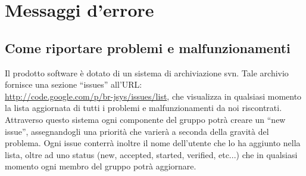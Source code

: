 \chapter{Messaggi d'errore}
\section{Come riportare problemi e malfunzionamenti}
Il prodotto software \`e dotato di un sistema di archiviazione svn. Tale archivio fornisce una sezione ``issues'' all'URL: \\ 
\href{http://code.google.com/p/br-jsys/issues/list}{http://code.google.com/p/br-jsys/issues/list}, che visualizza in qualsiasi momento la lista aggiornata di tutti i problemi e malfunzionamenti da noi riscontrati. Attraverso questo sistema ogni componente del gruppo potr\`a creare un ``new issue'', assegnandogli una priorit\`a che varier\`a a seconda della gravit\`a del problema. Ogni issue conterr\`a inoltre il nome dell'utente che lo ha aggiunto nella lista, oltre ad uno status (new, accepted, started, verified, etc...) che in qualsiasi momento ogni membro del gruppo potr\`a aggiornare. 

\newpage
